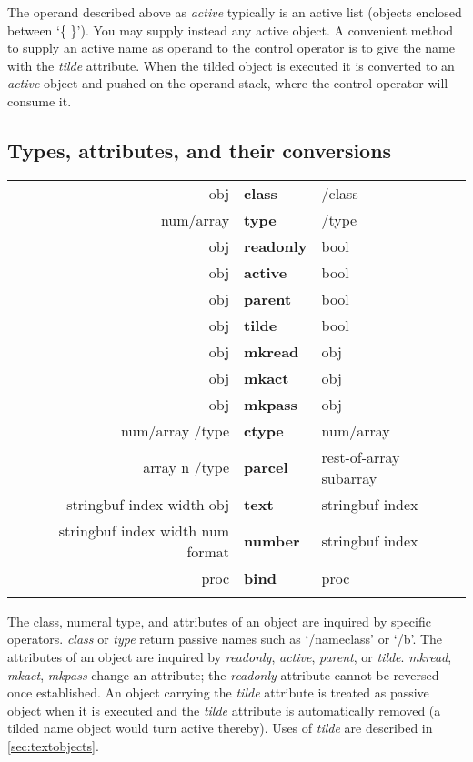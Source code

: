 The operand described above as \emph{active} typically is an active
list (objects enclosed between `\{ \}'). You may supply instead any
active object. A convenient method to supply an active name as operand
to the control operator is to give the name with the \emph{tilde}
attribute. When the tilded object is executed it is converted to an
\emph{active} object and pushed on the operand stack, where the
control operator will consume it.


\subsection{Types, attributes, and their conversions}

\begin{tabular}{>{\sffamily}r>{\sffamily\bfseries}l>{\sffamily}l}
obj & class & /class\\
num/array & type & /type\\
obj & readonly & bool\\
obj & active & bool\\
obj & parent & bool\\
obj & tilde & bool\\
obj & mkread & obj\\
obj & mkact & obj\\
obj & mkpass & obj\\
num/array /type & ctype & num/array\\
array n /type & parcel & rest-of-array subarray\\
stringbuf index width obj & text & stringbuf index\\
stringbuf index width num format & number & stringbuf index\\
proc & bind & proc\\\\
\end{tabular}


The  class,  numeral type,  and attributes of an object are  inquired by specific operators. \emph{class} or  \emph{type} return passive names such as  `/nameclass'  or  `/b'. The attributes of an object are inquired by \emph{readonly}, \emph{active}, \emph{parent}, or \emph{tilde}.  \emph{mkread}, \emph{mkact}, \emph{mkpass} change an attribute; the \emph{readonly} attribute cannot be reversed once established. An object carrying the \emph{tilde} attribute is treated as passive object when it is executed and the \emph{tilde} attribute is automatically removed (a tilded name object would turn active thereby). Uses of \emph{tilde} are described in \ref{sec:textobjects}.

